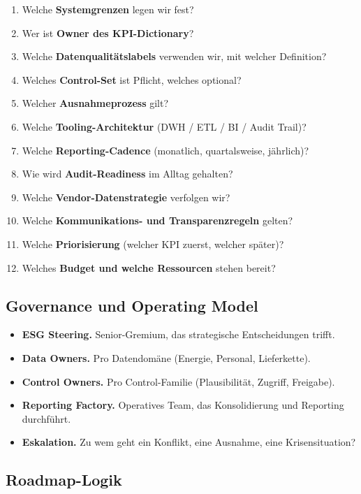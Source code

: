\documentclass[11pt,a4paper,oneside]{article}
\newcommand{\fachbegriff}[1]{\textbf{#1}}
\begin{document}
\begin{enumerate}
  \item Welche \textbf{Systemgrenzen} legen wir fest?
  \item Wer ist \textbf{Owner des KPI-Dictionary}?
  \item Welche \textbf{Datenqualitätslabels} verwenden wir, mit welcher Definition?
  \item Welches \textbf{Control-Set} ist Pflicht, welches optional?
  \item Welcher \textbf{Ausnahmeprozess} gilt?
  \item Welche \textbf{Tooling-Architektur} (DWH / ETL / BI / Audit Trail)?
  \item Welche \textbf{Reporting-Cadence} (monatlich, quartalsweise, jährlich)?
  \item Wie wird \textbf{Audit-Readiness} im Alltag gehalten?
  \item Welche \textbf{Vendor-Datenstrategie} verfolgen wir?
  \item Welche \textbf{Kommunikations- und Transparenzregeln} gelten?
  \item Welche \textbf{Priorisierung} (welcher KPI zuerst, welcher später)?
  \item Welches \textbf{Budget und welche Ressourcen} stehen bereit?
\end{enumerate}

\subsection{Governance und Operating Model}

\begin{itemize}
  \item \fachbegriff{ESG Steering.} Senior-Gremium, das strategische Entscheidungen trifft.
  \item \fachbegriff{Data Owners.} Pro Datendomäne (Energie, Personal, Lieferkette).
  \item \fachbegriff{Control Owners.} Pro Control-Familie (Plausibilität, Zugriff, Freigabe).
  \item \fachbegriff{Reporting Factory.} Operatives Team, das Konsolidierung und Reporting durchführt.
  \item \fachbegriff{Eskalation.} Zu wem geht ein Konflikt, eine Ausnahme, eine Krisensituation?
\end{itemize}

\subsection{Roadmap-Logik}
\end{document}
